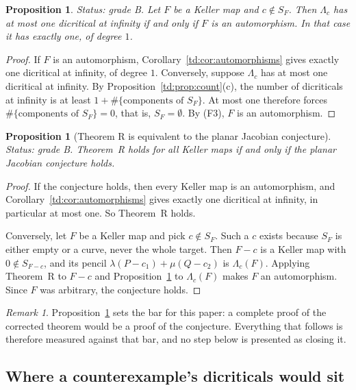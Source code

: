\documentclass[a4paper,11pt]{article}
\theoremstyle{plain}
\newtheorem{proposition}[theorem]{Proposition}
\theoremstyle{definition}
\theoremstyle{remark}
\newtheorem{remark}[theorem]{Remark}
\begin{document}
\begin{proposition}\label{td:prop:onedic}
\textit{Status: grade B.}
Let $F$ be a Keller map and $c \notin S_F$. Then $\Lambda_c$ has at most one dicritical at
infinity if and only if $F$ is an automorphism. In that case it has exactly one, of degree $1$.
\end{proposition}

\begin{proof}
If $F$ is an automorphism, Corollary~\ref{td:cor:automorphisms} gives exactly one dicritical at
infinity, of degree $1$. Conversely, suppose $\Lambda_c$ has at most one dicritical at
infinity. By Proposition~\ref{td:prop:count}(c), the number of dicriticals at infinity is at
least $1 + \#\{\text{components of } S_F\}$. At most one therefore forces
$\#\{\text{components of } S_F\} = 0$, that is, $S_F = \emptyset$. By (F3), $F$ is an
automorphism.
\end{proof}

\begin{proposition}[Theorem R is equivalent to the planar Jacobian conjecture]\label{td:prop:equiv}
\textit{Status: grade B.}
Theorem~R holds for all Keller maps if and only if the planar Jacobian conjecture holds.
\end{proposition}

\begin{proof}
If the conjecture holds, then every Keller map is an automorphism, and
Corollary~\ref{td:cor:automorphisms} gives exactly one dicritical at infinity, in particular at
most one. So Theorem~R holds.

Conversely, let $F$ be a Keller map and pick $c \notin S_F$. Such a $c$ exists because $S_F$
is either empty or a curve, never the whole target. Then $F - c$ is a Keller map with
$0 \notin S_{F-c}$, and its pencil $\lambda (P - c_1) + \mu (Q - c_2)$ is $\Lambda_c(F)$.
Applying Theorem~R to $F - c$ and Proposition~\ref{td:prop:onedic} to $\Lambda_c(F)$ makes $F$
an automorphism. Since $F$ was arbitrary, the conjecture holds.
\end{proof}

\begin{remark}
Proposition~\ref{td:prop:equiv} sets the bar for this paper: a complete proof of the corrected
theorem would be a proof of the conjecture. Everything that follows is therefore measured
against that bar, and no step below is presented as closing it.
\end{remark}

\subsection{Where a counterexample's dicriticals would sit}\label{td:sec:where}
\end{document}
